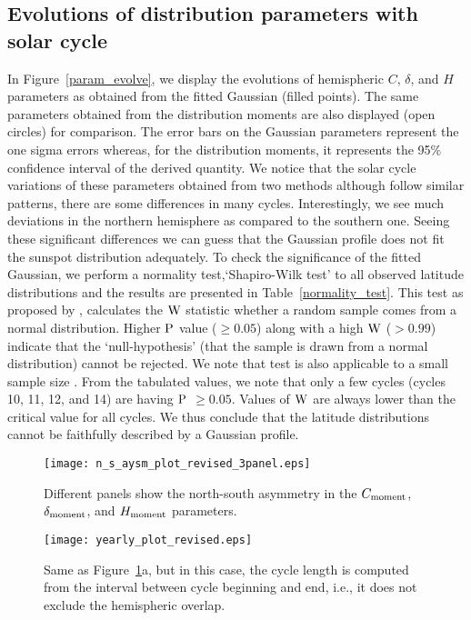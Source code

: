 \documentclass[preprint2,times,tighten]{aastex61}
\newcommand{\Fig}[1]{Figure~\ref{#1}}
\begin{document}
\subsection{Evolutions of distribution parameters with solar cycle}\label{sec:evol}
In \Fig{param_evolve}, we display the evolutions of hemispheric $C$, $\delta$, and $H$ parameters 
as obtained from the fitted Gaussian (filled points). The same parameters obtained from the distribution moments are 
also displayed (open circles) for comparison. 
The error bars on the Gaussian parameters represent the one sigma errors whereas, for the distribution moments, 
it represents the 95\% confidence interval of the derived quantity. 
We notice that the solar cycle variations of these parameters obtained from two methods
although follow similar patterns, there are some differences in many cycles. 
Interestingly, we see much deviations in the northern hemisphere as compared to the southern one. 
Seeing these significant differences we can guess that the Gaussian profile does not fit the sunspot distribution adequately.
To check the significance of the fitted Gaussian, we 
perform a normality test,`Shapiro-Wilk test' to all observed latitude distributions and
the results are presented in Table~\ref{normality_test}. 
This test as proposed by \citet{doi:10.1093/biomet/52.3-4.591}, 
calculates the $\rm{W}$ statistic whether a random sample comes from a normal distribution. 
Higher $\rm{P}$ value ($\geq0.05$) along with a high $\rm{W}$ ($>0.99$) indicate that the `null-hypothesis' 
(that the sample is drawn from a normal distribution) cannot be rejected. 
We note that test is also applicable to a small sample size \citep{Royston1992}. 
From the tabulated values, we note that only a few cycles (cycles 10, 11, 12, and 14) 
are having $\rm{P}$ $\geq0.05$. Values of $\rm{W}$ are always lower than the critical value for all cycles.
We thus conclude that the latitude distributions cannot be faithfully described by a Gaussian profile.


\begin{figure*}%
\centering
\texttt{[image: n\_s\_aysm\_plot\_revised\_3panel.eps]}
\caption{Different panels show the north-south asymmetry in the $C_{\rm{ moment}}$, $\delta_{\rm{ moment}}$, and $H_{\rm{ moment}}$ parameters.} 
\label{n_s_asym}
\end{figure*}

\begin{figure}%
\centering
\texttt{[image: yearly\_plot\_revised.eps]}
\caption{Same as \Fig{n_s_asym}a, but in this case, 
the cycle length is computed from the interval between cycle beginning and end,
i.e., it does not exclude the hemispheric overlap.}
\label{n_s_asym_yearly}
\end{figure}
\end{document}
